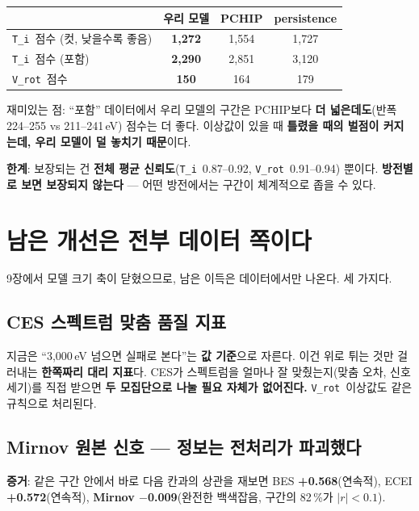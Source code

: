 \documentclass[10pt]{article}
\newcommand{\Ti}{\texttt{T\_i}}
\newcommand{\Vrot}{\texttt{V\_rot}}
\begin{document}
\begin{center}
\begin{tabular}{@{}lccc@{}}
\toprule
 & \textbf{우리 모델} & \textbf{PCHIP} & \textbf{persistence} \\
\midrule
\Ti\ 점수 (컷, 낮을수록 좋음) & \textbf{1{,}272} & 1{,}554 & 1{,}727 \\
\Ti\ 점수 (포함) & \textbf{2{,}290} & 2{,}851 & 3{,}120 \\
\Vrot\ 점수 & \textbf{150} & 164 & 179 \\
\bottomrule
\end{tabular}
\end{center}

재미있는 점: ``포함'' 데이터에서 우리 모델의 구간은 PCHIP보다 \textbf{더 넓은데도}(반폭
224--255 vs 211--241\,eV) 점수는 더 좋다. 이상값이 있을 때 \textbf{틀렸을 때의 벌점이
커지는데, 우리 모델이 덜 놓치기 때문}이다.

\textbf{한계}: 보장되는 건 \textbf{전체 평균 신뢰도}(\Ti\ 0.87--0.92, \Vrot\ 0.91--0.94)
뿐이다. \textbf{방전별로 보면 보장되지 않는다} --- 어떤 방전에서는 구간이 체계적으로 좁을
수 있다.

\section{남은 개선은 전부 데이터 쪽이다}
\label{sec:data}

9장에서 모델 크기 축이 닫혔으므로, 남은 이득은 데이터에서만 나온다. 세 가지다.

\subsection{CES 스펙트럼 맞춤 품질 지표}

지금은 ``3{,}000\,eV 넘으면 실패로 본다''는 \textbf{값 기준}으로 자른다. 이건 위로 튀는 것만
걸러내는 \textbf{한쪽짜리 대리 지표}다. CES가 스펙트럼을 얼마나 잘 맞췄는지(맞춤 오차,
신호 세기)를 직접 받으면 \textbf{두 모집단으로 나눌 필요 자체가 없어진다.} \Vrot\ 이상값도
같은 규칙으로 처리된다.

\subsection{Mirnov 원본 신호 --- 정보는 전처리가 파괴했다}

\textbf{증거}: 같은 구간 안에서 바로 다음 칸과의 상관을 재보면
BES \textbf{+0.568}(연속적), ECEI \textbf{+0.572}(연속적),
\textbf{Mirnov $-$0.009}(완전한 백색잡음, 구간의 82\,\%가 $|r| < 0.1$).
\end{document}
